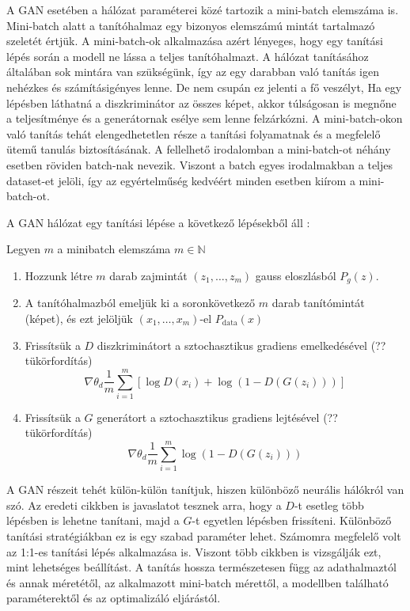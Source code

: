 A GAN esetében a hálózat paraméterei közé tartozik a mini-batch elemszáma is. Mini-batch alatt a tanítóhalmaz egy bizonyos elemszámú mintát tartalmazó szeletét értjük. A mini-batch-ok alkalmazása azért lényeges, hogy egy tanítási lépés során a modell ne lássa a teljes tanítóhalmazt. A hálózat tanításához általában sok mintára van szükségünk, így az egy darabban való tanítás igen nehézkes és számításigényes lenne. De nem csupán ez jelenti a fő veszélyt, Ha egy lépésben láthatná a diszkriminátor az összes képet, akkor túlságosan is megnőne a teljesítménye és a generátornak esélye sem lenne felzárkózni. A mini-batch-okon való tanítás tehát elengedhetetlen része a tanítási folyamatnak és a megfelelő ütemű tanulás biztosításának.
A fellelhető irodalomban a mini-batch-ot néhány esetben röviden batch-nak nevezik. Viszont a batch egyes irodalmakban a teljes dataset-et jelöli, így az egyértelműség kedvéért minden esetben kiírom a mini-batch-ot.


A GAN hálózat egy tanítási lépése a következő lépésekből áll \cite{goodfellow2014generative}:

Legyen $m$ a minibatch elemszáma $m \in \mathbb{N}$
\begin{enumerate}
\item Hozzunk létre $m$ darab zajmintát $(z_1, \ldots, z_m)$ gauss eloszlásból $P_g(z)$.
\item A tanítóhalmazból emeljük ki a soronkövetkező $m$ darab tanítómintát (képet), és ezt jelöljük $(x_1, \ldots, x_m)$-el $P_{\text{data}}(x)$
\item Frissítsük a $D$ diszkriminátort a sztochasztikus gradiens emelkedésével (?? tükörfordítás)
$$ \nabla \theta_d \frac{1}{m} \sum_{i=1}^{m} \left[\log D(x_i) + \log(1 - D(G(z_i))) \right]$$
\item  Frissítsük a $G$ generátort a sztochasztikus gradiens lejtésével (?? tükörfordítás)
$$ \nabla \theta_d \frac{1}{m} \sum_{i=1}^{m} \log(1 - D(G(z_i)))$$
\end{enumerate}

A GAN részeit tehét külön-külön tanítjuk, hiszen különböző neurális hálókról van szó. Az eredeti cikkben is javaslatot tesznek arra, hogy a $D$-t esetleg több lépésben is lehetne tanítani, majd a $G$-t egyetlen lépésben frissíteni.
Különböző tanítási stratégiákban ez is egy szabad paraméter lehet. Számomra megfelelő volt az 1:1-es tanítási lépés alkalmazása is. Viszont több cikkben is vizsgálják ezt, mint lehetséges beállítást.
A tanítás hossza természetesen függ az adathalmaztól és annak méretétől, az alkalmazott mini-batch mérettől, a modellben található paraméterektől és az optimalizáló eljárástól.

